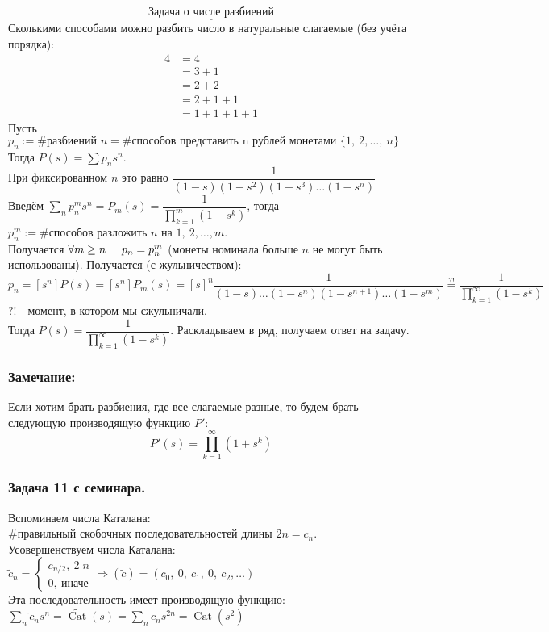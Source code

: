 \documentclass[12pt, letterpaper, twoside]{article}
\newcommand{\Underl}[1]{$\underline{\text{#1}}$}
\newcommand{\DS}{\displaystyle}
\newcommand{\oo}{\infty}
\begin{document}
    \newpage
    \[\text{\Underl{Задача о числе разбиений}}\]
    Сколькими способами можно разбить число в натуральные слагаемые (без учёта порядка):
    \begin{align*}
        4 &= 4\\
        &= 3 + 1\\
        &= 2 + 2\\
        &= 2 + 1 + 1\\
        &= 1 + 1 + 1 + 1
    \end{align*}
    Пусть $p_n := \#\text{разбиений }n = \#\text{способов представить n рублей монетами $\{1,\ 2,\dots,\ n\}$}$\\
    Тогда $P(s) = \DS\sum p_ns^{n}$.\\
    При фиксированном $n$ это равно $\dfrac{1}{(1 - s)(1 - s^2)(1 - s^3)\dots(1 - s^n)}$\\
    Введём $\DS\sum_n p_n^m s^n = P_m(s) = \dfrac{1}{\prod\limits_{k = 1}^{m}(1 - s^k)}$, тогда $p_n^m := \#\text{способов разложить $n$ на $1,\ 2,\dots, m$}$.\\
    Получается $\forall m \geq n\hspace{0.5cm} p_n = p_n^m$ (монеты номинала больше $n$ не могут быть использованы). Получается (с жульничеством):
    \[p_n = [s^n]P(s) = [s^n]P_m(s) = [s]^n \frac{1}{(1 - s)\dots(1 - s^n)(1 - s^{n + 1})\dots(1 - s^m)} \overset{?!}{=} \frac{1}{\prod\limits_{k = 1}^{\oo} (1 - s^k)}\]
    $?!$ - момент, в котором мы сжульничали.\\
    Тогда $P(s) = \dfrac{1}{\prod\limits_{k = 1}^{\oo} (1 - s^k)}$. Раскладываем в ряд, получаем ответ на задачу.\\
    \subsubsection*{Замечание:}
    Если хотим брать разбиения, где все слагаемые разные, то будем брать следующую производящую функцию $P'$:
    \[P'(s) = \prod_{k = 1}^{\oo}(1 + s^k)\]
    \newpage
    \subsubsection*{Задача 11 с семинара.}
    Вспоминаем числа Каталана:\\
    $\#\text{правильный скобочных последовательностей длины $2n$} = c_n$.\\
    Усовершенствуем числа Каталана:\\
    $\tilde{c}_n = \begin{cases}
        c_{n/2},\ 2 \big| n\\
        0,\ \text{иначе}
    \end{cases}\Rightarrow (\tilde{c}) = (c_0,\ 0,\ c_1,\ 0,\ c_2,\dots)$\\
    Эта последовательность имеет производящую функцию:\\
    $\DS\sum_n \tilde{c}_n s^n = \tilde{\operatorname{Cat}}(s) = \sum_n c_ns^{2n} = \operatorname{Cat}(s^2)$
\end{document}
